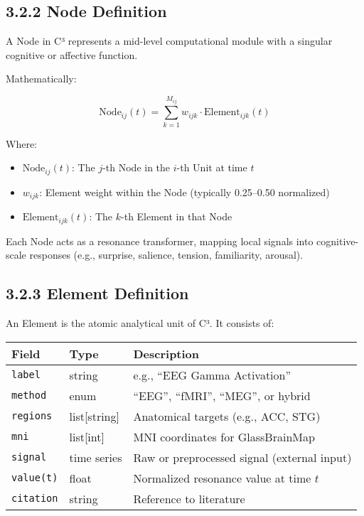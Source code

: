 \subsection*{3.2.2 Node Definition}

A Node in C³ represents a mid-level computational module with a singular cognitive or affective function.

Mathematically:

\[
\text{Node}_{ij}(t) = \sum_{k=1}^{M_{ij}} w_{ijk} \cdot \text{Element}_{ijk}(t)
\]

Where:

\begin{itemize}
    \item $\text{Node}_{ij}(t)$: The $j$-th Node in the $i$-th Unit at time $t$
    \item $w_{ijk}$: Element weight within the Node (typically 0.25–0.50 normalized)
    \item $\text{Element}_{ijk}(t)$: The $k$-th Element in that Node
\end{itemize}

Each Node acts as a resonance transformer, mapping local signals into cognitive-scale responses (e.g., surprise, salience, tension, familiarity, arousal).

\subsection*{3.2.3 Element Definition}

An Element is the atomic analytical unit of C³. It consists of:

\begin{center}
\begin{tabular}{|l|l|p{8cm}|}
\hline
\textbf{Field} & \textbf{Type} & \textbf{Description} \\
\hline
\texttt{label} & string & e.g., ``EEG Gamma Activation'' \\
\texttt{method} & enum & ``EEG'', ``fMRI'', ``MEG'', or hybrid \\
\texttt{regions} & list[string] & Anatomical targets (e.g., ACC, STG) \\
\texttt{mni} & list[int] & MNI coordinates for GlassBrainMap \\
\texttt{signal} & time series & Raw or preprocessed signal (external input) \\
\texttt{value(t)} & float & Normalized resonance value at time $t$ \\
\texttt{citation} & string & Reference to literature \\
\hline
\end{tabular}
\end{center}

